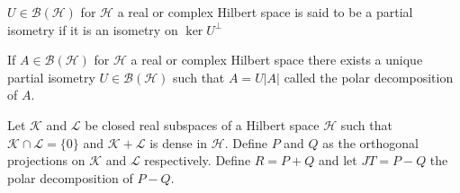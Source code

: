 \begin{definition}
$U\in\mathcal{B}(\mathcal{H})$ for $\mathcal{H}$ a real or complex Hilbert space is said to be a partial isometry if it is an isometry on $\ker U^\bot$
\end{definition}

\begin{theorem}
If $A\in\mathcal{B}(\mathcal{H})$ for $\mathcal{H}$ a real or complex Hilbert space there exists a unique partial isometry $U\in\mathcal{B}(\mathcal{H})$ such that $A=U|A|$ called the polar decomposition of $A$. 
\end{theorem}

Let $\mathcal{K}$ and $\mathcal{L}$ be closed real subspaces of a Hilbert space $\mathcal{H}$ such that $\mathcal{K}\cap\mathcal{L}=\{0\}$ and $\mathcal{K}+\mathcal{L}$ is dense in $\mathcal{H}$. Define $P$ and $Q$ as the orthogonal projections on $\mathcal{K}$ and $\mathcal{L}$ respectively. Define $R=P+Q$ and let $JT=P-Q$ the polar decomposition of $P-Q$.
